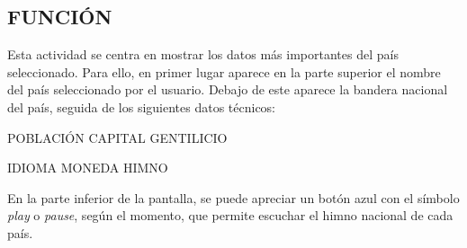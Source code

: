 \documentclass[letterpaper,twocolumn,openany,nodeprecatedcode,dvipsnames,nomultitoc]{dndbook}
\begin{document}
\begin{justify}
\subsection{FUNCIÓN}
\par 
Esta actividad se centra en mostrar los datos más importantes del país seleccionado. Para ello, en primer lugar aparece en la parte superior el nombre del país seleccionado por el usuario. Debajo de este aparece la bandera nacional del país, seguida de los siguientes datos técnicos:
\vspace{5pt}
\begin{center}
 POBLACIÓN CAPITAL GENTILICIO \par
 IDIOMA MONEDA HIMNO 
\end{center}
\vspace{5pt}
\par 
En la parte inferior de la pantalla, se puede apreciar un botón azul con el símbolo \textit{play} o \textit{pause}, según el momento, que permite escuchar el himno nacional de cada país.


\end{justify}
\end{document}
